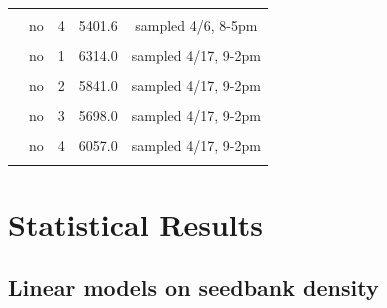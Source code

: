 \documentclass[
]{article}
\begin{document}
\begin{table}[H]
\begin{tabular}[t]{ccccc}
\cellcolor{gray!6}{East} & \cellcolor{gray!6}{rye} & \cellcolor{gray!6}{3} & \cellcolor{gray!6}{4991.7} & \cellcolor{gray!6}{sampled 4/6, 8-5pm}\\
 & no & 4 & 5401.6 & sampled 4/6, 8-5pm\\

\cellcolor{gray!6}{East} & \cellcolor{gray!6}{rye} & \cellcolor{gray!6}{4} & \cellcolor{gray!6}{5163.9} & \cellcolor{gray!6}{sampled 4/6, 8-5pm}\\
 & no & 1 & 6314.0 & sampled 4/17, 9-2pm\\

\cellcolor{gray!6}{West} & \cellcolor{gray!6}{rye} & \cellcolor{gray!6}{1} & \cellcolor{gray!6}{6401.0} & \cellcolor{gray!6}{sampled 4/17, 9-2pm}\\
 & no & 2 & 5841.0 & sampled 4/17, 9-2pm\\

\cellcolor{gray!6}{West} & \cellcolor{gray!6}{rye} & \cellcolor{gray!6}{2} & \cellcolor{gray!6}{5543.0} & \cellcolor{gray!6}{sampled 4/17, 9-2pm}\\
 & no & 3 & 5698.0 & sampled 4/17, 9-2pm\\

\cellcolor{gray!6}{West} & \cellcolor{gray!6}{rye} & \cellcolor{gray!6}{3} & \cellcolor{gray!6}{5947.0} & \cellcolor{gray!6}{sampled 4/17, 9-2pm}\\
 & no & 4 & 6057.0 & sampled 4/17, 9-2pm\\

\cellcolor{gray!6}{West} & \cellcolor{gray!6}{rye} & \cellcolor{gray!6}{4} & \cellcolor{gray!6}{5989.0} & \cellcolor{gray!6}{sampled 4/17, 9-2pm}\\
\bottomrule
\end{tabular}
\end{table}

\newpage

\hypertarget{statistical-results}{%
\section{Statistical Results}\label{statistical-results}}

\hypertarget{linear-models-on-seedbank-density}{%
\subsection{Linear models on seedbank
density}\label{linear-models-on-seedbank-density}}
\end{document}
